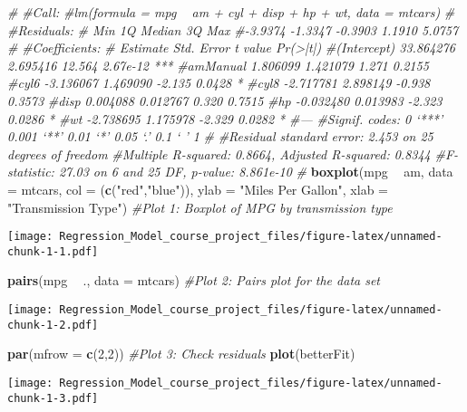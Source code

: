 \documentclass[]{article}
\newenvironment{Shaded}{\begin{snugshade}}{\end{snugshade}}
\newcommand{\KeywordTok}[1]{\textcolor[rgb]{0.13,0.29,0.53}{\textbf{#1}}}
\newcommand{\DataTypeTok}[1]{\textcolor[rgb]{0.13,0.29,0.53}{#1}}
\newcommand{\DecValTok}[1]{\textcolor[rgb]{0.00,0.00,0.81}{#1}}
\newcommand{\StringTok}[1]{\textcolor[rgb]{0.31,0.60,0.02}{#1}}
\newcommand{\CommentTok}[1]{\textcolor[rgb]{0.56,0.35,0.01}{\textit{#1}}}
\newcommand{\OperatorTok}[1]{\textcolor[rgb]{0.81,0.36,0.00}{\textbf{#1}}}
\newcommand{\NormalTok}[1]{#1}
\begin{document}
\begin{Shaded}
\begin{Highlighting}[]
\CommentTok{#}
\CommentTok{#Call:}
\CommentTok{#lm(formula = mpg ~ am + cyl + disp + hp + wt, data = mtcars)}
\CommentTok{#}
\CommentTok{#Residuals:}
\CommentTok{#    Min      1Q  Median      3Q     Max }
\CommentTok{#-3.9374 -1.3347 -0.3903  1.1910  5.0757 }
\CommentTok{#}
\CommentTok{#Coefficients:}
\CommentTok{#             Estimate Std. Error t value Pr(>|t|)    }
\CommentTok{#(Intercept) 33.864276   2.695416  12.564 2.67e-12 ***}
\CommentTok{#amManual     1.806099   1.421079   1.271   0.2155    }
\CommentTok{#cyl6        -3.136067   1.469090  -2.135   0.0428 *  }
\CommentTok{#cyl8        -2.717781   2.898149  -0.938   0.3573    }
\CommentTok{#disp         0.004088   0.012767   0.320   0.7515    }
\CommentTok{#hp          -0.032480   0.013983  -2.323   0.0286 *  }
\CommentTok{#wt          -2.738695   1.175978  -2.329   0.0282 *  }
\CommentTok{#---}
\CommentTok{#Signif. codes:  0 ‘***’ 0.001 ‘**’ 0.01 ‘*’ 0.05 ‘.’ 0.1 ‘ ’ 1}
\CommentTok{#}
\CommentTok{#Residual standard error: 2.453 on 25 degrees of freedom}
\CommentTok{#Multiple R-squared:  0.8664,   Adjusted R-squared:  0.8344 }
\CommentTok{#F-statistic: 27.03 on 6 and 25 DF,  p-value: 8.861e-10}
\CommentTok{#}
\KeywordTok{boxplot}\NormalTok{(mpg }\OperatorTok{~}\StringTok{ }\NormalTok{am, }\DataTypeTok{data =}\NormalTok{ mtcars, }\DataTypeTok{col =}\NormalTok{ (}\KeywordTok{c}\NormalTok{(}\StringTok{"red"}\NormalTok{,}\StringTok{"blue"}\NormalTok{)), }\DataTypeTok{ylab =} \StringTok{"Miles Per Gallon"}\NormalTok{, }\DataTypeTok{xlab =} \StringTok{"Transmission Type"}\NormalTok{) }\CommentTok{#Plot 1: Boxplot of MPG by transmission type}
\end{Highlighting}
\end{Shaded}

\texttt{[image: Regression\_Model\_course\_project\_files/figure-latex/unnamed-chunk-1-1.pdf]}

\begin{Shaded}
\begin{Highlighting}[]
\KeywordTok{pairs}\NormalTok{(mpg }\OperatorTok{~}\StringTok{ }\NormalTok{., }\DataTypeTok{data =}\NormalTok{ mtcars) }\CommentTok{#Plot 2: Pairs plot for the data set}
\end{Highlighting}
\end{Shaded}

\texttt{[image: Regression\_Model\_course\_project\_files/figure-latex/unnamed-chunk-1-2.pdf]}

\begin{Shaded}
\begin{Highlighting}[]
\KeywordTok{par}\NormalTok{(}\DataTypeTok{mfrow =} \KeywordTok{c}\NormalTok{(}\DecValTok{2}\NormalTok{,}\DecValTok{2}\NormalTok{)) }\CommentTok{#Plot 3: Check residuals}
\KeywordTok{plot}\NormalTok{(betterFit)}
\end{Highlighting}
\end{Shaded}

\texttt{[image: Regression\_Model\_course\_project\_files/figure-latex/unnamed-chunk-1-3.pdf]}
\end{document}
